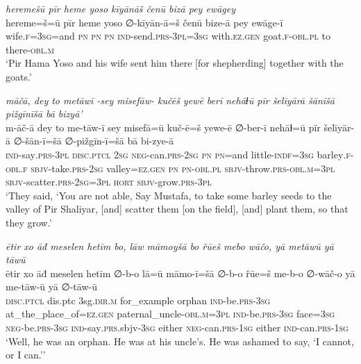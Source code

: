 \ea \label{ŽP.22}
\textit{heremešū pīr heme yoso kīyānāš čenū bizā pey ewāgey} \\ 
\gll hereme=š=ū pīr heme yoso ∅-kīyān-ā=š čenū bize-ā pey ewāge-ī \\ 
 wife\textsc{.f}\textsc{=3sg}=and \textsc{pn} \textsc{pn} \textsc{pn} \textsc{ind-}send\textsc{.prs}\textsc{-3pl}\textsc{=3sg} with\textsc{.ez.gen} goat\textsc{.f}\textsc{-obl}\textsc{.pl} to there\textsc{-obl}\textsc{.m} \\ 
\glt `Pir Hama Yoso and his wife sent him there [for shepherding] together with the goats.'
\z 
 
\ea \label{ŽP.27}
\textit{māčā, dey to metāwī -sey misefāw- kučēš yewē berī nehāɫū pīr šelīyārā šānīšā pižgīnīšā bā bizyā’} \\ 
\gll m-āč-ā dey to me-tāw-ī sey misefā=ū kuč-ē=š yewe-ē ∅-ber-ī nehāɫ=ū pīr šelīyār-ā ∅-šān-ī=šā ∅-pižgīn-ī=šā bā bi-zye-ā \\ 
 \textsc{ind-}say\textsc{.prs}\textsc{-3pl} \textsc{disc.ptcl} \textsc{2sg} \textsc{neg-}can\textsc{.prs}-\textsc{2sg} \textsc{pn} \textsc{pn}=and little\textsc{-indf}\textsc{=3sg} barley\textsc{.f}\textsc{-obl}\textsc{.f} \textsc{sbjv-}take\textsc{.prs}-\textsc{2sg} valley\textsc{\textsc{=ez.gen}} \textsc{pn} \textsc{pn}\textsc{-obl}\textsc{.pl} \textsc{sbjv-}throw\textsc{.prs}\textsc{-obl}\textsc{.m}\textsc{=3pl} \textsc{sbjv-}scatter\textsc{.prs}-\textsc{2sg}\textsc{=3pl} \textsc{hort} \textsc{sbjv-}grow\textsc{.prs}\textsc{-3pl} \\ 
\glt `They said, ‘You are not able, Say Mustafa, to take some barley seeds to the valley of Pir Shaliyar, [and] scatter them [on the field], [and] plant them, so that they grow.'
\z 
 
\ea \label{ŽP.28}
\textit{ētir xo āđ meselen hetīm bo, lāw māmoyšā bo řūeš mebo wāčo, yā metāwū yā tāwū} \\ 
\gll ētir xo āđ meselen hetīm ∅-b-o lā=ū māmo-ī=šā ∅-b-o řūe=š me-b-o ∅-wāč-o yā me-tāw-ū yā ∅-tāw-ū \\ 
 \textsc{disc.ptcl} dis.ptc 3sg\textsc{.dir}\textsc{.m} for\_example orphan \textsc{ind-}be\textsc{.prs}\textsc{-3sg} at\_the\_place\_of\textsc{\textsc{=ez.gen}} paternal\_uncle\textsc{-obl}\textsc{.m}\textsc{=3pl} \textsc{ind-}be\textsc{.prs}\textsc{-3sg} face\textsc{=3sg} \textsc{neg-}be\textsc{.prs}\textsc{-3sg} \textsc{ind-}say\textsc{.prs}.sbjv\textsc{-3sg} either \textsc{neg-}can\textsc{.prs}\textsc{-\textsc{1sg}} either \textsc{ind-}can\textsc{.prs}\textsc{-\textsc{1sg}} \\ 
\glt `Well, he was an orphan. He was at his uncle’s. He was ashamed to say, ‘I cannot, or I can.’'
\z 
 
